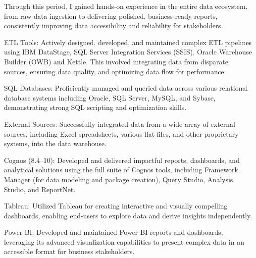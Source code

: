 \begin{cventries}
{      \vspace{1.5em}
      Through this period, I gained hands-on experience in the entire data ecosystem, from raw data ingestion to delivering polished, business-ready reports, consistently improving data accessibility and reliability for stakeholders.
      \vspace{1.5em}
      \begin{cvitems}
        \item {ETL Tools: Actively designed, developed, and maintained complex ETL pipelines using IBM DataStage, SQL Server Integration Services (SSIS), Oracle Warehouse Builder (OWB) and Kettle. This involved integrating data from disparate sources, ensuring data quality, and optimizing data flow for performance.}
        \item {SQL Databases: Proficiently managed and queried data across various relational database systems including Oracle, SQL Server, MySQL, and Sybase, demonstrating strong SQL scripting and optimization skills.}
        \item {External Sources: Successfully integrated data from a wide array of external sources, including Excel spreadsheets, various flat files, and other proprietary systems, into the data warehouse.}
        \item {Cognos (8.4–10): Developed and delivered impactful reports, dashboards, and analytical solutions using the full suite of Cognos tools, including Framework Manager (for data modeling and package creation), Query Studio, Analysis Studio, and ReportNet.}
        \item {Tableau: Utilized Tableau for creating interactive and visually compelling dashboards, enabling end-users to explore data and derive insights independently.}
        \item {Power BI: Developed and maintained Power BI reports and dashboards, leveraging its advanced visualization capabilities to present complex data in an accessible format for business stakeholders.}
      \end{cvitems}
    }
 
\end{cventries}
